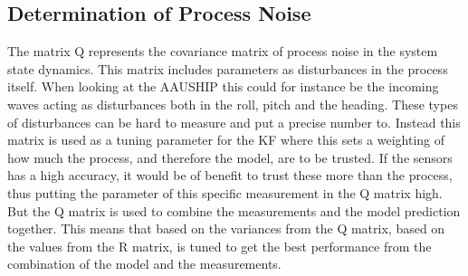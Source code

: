 \subsection{Determination of Process Noise}
The matrix Q represents the covariance matrix of process noise in the system state dynamics. This matrix includes parameters as disturbances in the process itself. When looking at the AAUSHIP this could for instance be the incoming waves acting as disturbances both in the roll, pitch and the heading. These types of disturbances can be hard to measure and put a precise number to. Instead this matrix is used as a tuning parameter for the \ac{KF} where this sets a weighting of how much the process, and therefore the model, are to be trusted. If the sensors has a high accuracy, it would be of benefit to trust these more than the process, thus putting the parameter of this specific measurement in the Q matrix high. But the Q matrix is used to combine the measurements and the model prediction together. This means that based on the variances from the Q matrix, based on the values from the R matrix, is tuned to get the best performance from the combination of the model and the measurements.

